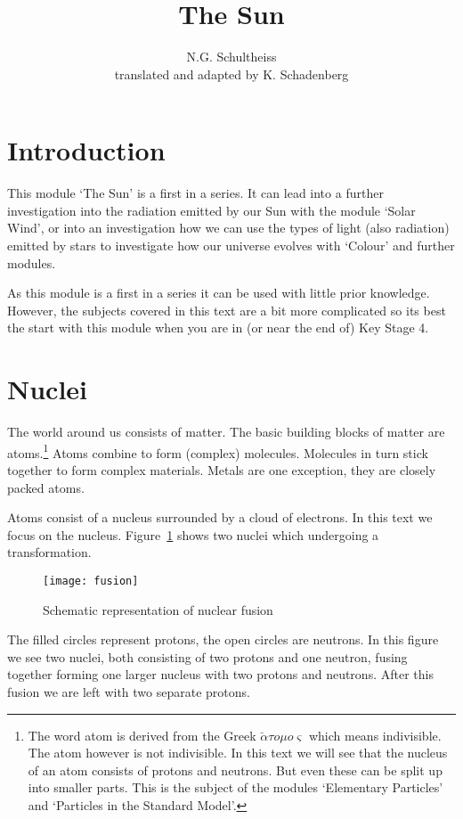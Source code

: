 


\author{N.G. Schultheiss \\ translated and adapted by K. Schadenberg}
\date{}
\title{The Sun}



\maketitle

\section{Introduction}
This module `The Sun' is a first in a series. It can lead into a further investigation into the radiation emitted by our Sun with the module `Solar Wind', or into an investigation how we can use the types of light (also radiation) emitted by stars to investigate how our universe evolves with `Colour' and further modules.

As this module is a first in a series it can be used with little prior knowledge. However, the subjects covered in this text are a bit more complicated so its best the start with this module when you are in (or near the end of) Key Stage 4.

\section{Nuclei}
The world around us consists of matter. The basic building blocks of matter are atoms.\footnote{The word atom is derived from the Greek $\breve{\alpha}\tau o \mu o \varsigma$ which means indivisible. The atom however is not indivisible. In this text we will see that the nucleus of an atom consists of protons and neutrons. But even these can be split up into smaller parts. This is the subject of the modules `Elementary Particles' and `Particles in the Standard Model'.} Atoms combine to form (complex) molecules. Molecules in turn stick together to form complex materials. Metals are one exception, they are closely packed atoms.

Atoms consist of a nucleus surrounded by a cloud of electrons. In this text we focus on the nucleus. Figure~\ref{fig:fusion_schem} shows two nuclei which undergoing a transformation.
\begin{figure}\begin{center}
\texttt{[image: fusion]}%
\caption{Schematic representation of nuclear fusion}\label{fig:fusion_schem}
\end{center}\end{figure}
The filled circles represent protons, the open circles are neutrons. In this figure we see two nuclei, both consisting of two protons and one neutron, fusing together forming one larger nucleus with two protons and neutrons. After this fusion we are left with two separate protons.

